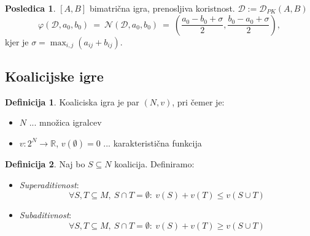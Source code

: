 \documentclass[11pt]{article}
\newcommand{\R}{\mathbb{R}}
\newcommand{\N}{\mathbb{N}}
\newcommand{\oklepaj}[1]{\left(#1\right)}
\newcommand{\1}{\mathbbm{1}}
\renewcommand{\N}{\mathcal{N}}
\newcommand{\D}{\mathcal{D}}
\theoremstyle{definition}
\newtheorem{definicija}{Definicija}[section]
\theoremstyle{definition}
\theoremstyle{definition}
\theoremstyle{definition}
\newtheorem*{posledica}{Posledica}
\begin{document}
\begin{posledica}

$[A,B]$ bimatrična igra, prenosljiva koristnost. $\D := \D_{PK}(A,B)$
$$\varphi(\D,a_0,b_0) ~=~ \N(\D,a_0,b_0) ~=~ \oklepaj{\frac{a_0-b_0+\sigma}{2},\frac{b_0-a_0+\sigma}{2}},$$
kjer je $\sigma = \max_{i,j}(a_{ij} + b_{ij})$.

\end{posledica}
\vspace{0.5cm}


\subsection{Koalicijske igre}
\vspace{0.5cm}

\begin{definicija}

Koaliciska igra je par $(N,v)$, pri čemer je:
\begin{itemize}
	\item $N$ ... množica igralcev
	\item $v: 2^N \rightarrow \R$, $v(\emptyset)=0$ ... karakteristična funkcija
\end{itemize}

\end{definicija}
\vspace{0.5cm}

\begin{definicija}

Naj bo $S \subseteq N$ koalicija. Definiramo:
\begin{itemize}
	\item \textit{Superaditivnost}:
	$$\forall S,T \subseteq M, ~S \cap T = \emptyset: ~v(S)+v(T) \leq v(S\cup T)$$
	\item \textit{Subaditivnost}:
	$$\forall S,T \subseteq M, ~S \cap T = \emptyset: ~v(S)+v(T) \geq v(S\cup T)$$
\end{itemize}

\end{definicija}
\vspace{0.5cm}
\end{document}
